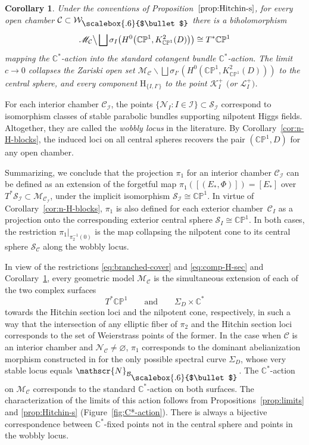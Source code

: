 \documentclass[10pt,a4paper]{amsart}
\newcommand{\field}[1]{\ensuremath{\mathbb{#1}}}
\newcommand{\CC}{\field{C}}
\newcommand{\PP}{\field{P}}
\newcommand\sbul[1][.6]{\mathbin{\vcenter{\hbox{\scalebox{#1}{$\bullet$}}}}}
\newcommand{\curly}[1]{\mathscr{#1}}
\newcommand{\cK}{\curly{K}}
\newcommand{\cL}{\curly{L}}
\newcommand{\cM}{\curly{M}}
\newcommand{\cN}{\curly{N}}
\newcommand{\cS}{\curly{S}}
\newcommand{\qB}{\mathcal{B}}
\newcommand{\qC}{\mathcal{C}}
\newcommand{\qI}{\mathcal{I}}
\newcommand{\qW}{\mathcal{W}}
\numberwithin{equation}{section}
\newtheorem{Corollary}[Theorem]{Corollary}
\begin{document}
\begin{Corollary}\label{cor:T*CP1}
Under the conventions of Proposition~$\ref{prop:Hitchin-s}$, for every open chamber $\qC\subset \qW_{\sbul}$ there is a biholomorphism
\begin{gather}\label{eq:comp-H-sec}
\cM_{\qC}\big\backslash\bigsqcup \sigma_{I}\bigl(H^{0}\bigl(\CC\PP^{1},K^{2}_{\CC\PP^{1}}(D)\bigr)\bigr) \cong T^{*}\CC\PP^{1}
\end{gather}
mapping the $\CC^{*}$-action into the standard cotangent bundle $\CC^{*}$-action.
The limit $c\to 0$ collapses the Zariski open set
$\cM_{\qC}\backslash\bigsqcup \sigma_{I'}(H^{0}(\CC\PP^{1},K^{2}_{\CC\PP^{1}}(D)))$
to the central sphere, and every component $\mathrm{H}_{\{I,I'\}}$ to the point $\cK^{+}_{I}$ $($or $\cL^{+}_{I})$.
\end{Corollary}

\begin{Remark}
For each interior chamber $\qC_{\qI}$, the points $\{\cN_{I}\colon I\in\qI\}\subset \cS_{\qI}$ correspond to isomorphism classes of stable parabolic bundles supporting nilpotent Higgs fields. Altogether, they are called the \textit{wobbly locus} in the literature. By Corollary~\ref{cor:n-H-blocks}, the induced loci on all central spheres recovers the pair $(\CC\PP^{1},D)$ for any open chamber.
\end{Remark}

Summarizing, we conclude that the projection $\pi_{1}$ for an interior chamber $\qC_{\qI}$ can be defined as an extension of the forgetful map $\pi_{1}([(E_{*},\Phi)]) = [E_{*}]$
over $T^{*}\cS_{\qI}\subset\cM_{\qC_{\qI}}$, under the implicit isomorphism $\cS_{\qI}\cong \CC\PP^{1}$. In virtue of Corollary~\ref{cor:n-H-blocks}, $\pi_{1}$ is also defined for each exterior chamber~$\qC_{I}$ as a projection onto the corresponding exterior central sphere $\cS_{I}\cong\CC\PP^{1}$.
In both cases, the restriction $\pi_{1}\vert_{\pi^{-1}_{2}(0)}$ is the map collapsing the nilpotent cone to its central sphere $\cS_{\qC}$ along the wobbly locus.

In view of the restrictions \eqref{eq:branched-cover} and \eqref{eq:comp-H-sec} and Corollary~\ref{cor:T*CP1}, every geometric model $\cM_{\qC}$ is the simultaneous extension of each of the two complex surfaces
\[
T^{*}\CC\PP^{1}\qquad \text{and}\qquad \Sigma_{D}\times\CC^{*}
\]
towards the Hitchin section loci and the nilpotent cone, respectively, in such a way that the intersection of any elliptic fiber of $\pi_{2}$ and the Hitchin section loci corresponds to the set of Weierstrass points of the former. In the case when $\qC$ is an interior chamber and $\cN_{\qC}\neq \varnothing $, $\pi_{1}$ corresponds to the dominant abelianization morphism constructed in \cite{BNR89} for the only possible spectral curve $\Sigma_{D}$, whose very stable locus equals $\cN_{\qB_{\sbul}}$.
The $\CC^{*}$-action on $\cM_{\qC}$ corresponds to the standard $\CC^{*}$-action on both surfaces. The characterization of the limits of this action follows from Propositions~\ref{prop:limits} and \ref{prop:Hitchin-s} (Figure~\ref{fig:C*-action}). There is always a bijective correspondence between $\CC^{*}$-fixed points not in the central sphere and points in the wobbly locus.
\end{document}
